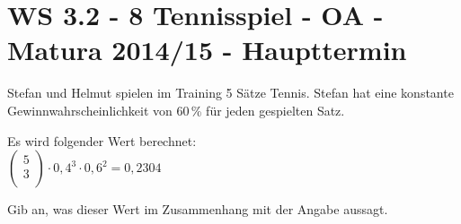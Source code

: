 \section{WS 3.2 - 8 Tennisspiel - OA - Matura 2014/15 - Haupttermin}

\begin{beispiel}[WS 3.2]{1} %
Stefan und Helmut spielen im Training 5 Sätze Tennis. Stefan hat eine konstante Gewinnwahrscheinlichkeit von 60\,\% für jeden gespielten Satz. \leer

Es wird folgender Wert berechnet:\\

$\begin{pmatrix}5 \\ 3 \\\end{pmatrix} \cdot 0,4^3 \cdot 0,6^2 =0,2304$ \leer

Gib an, was dieser Wert im Zusammenhang mit der Angabe aussagt.


\end{beispiel}